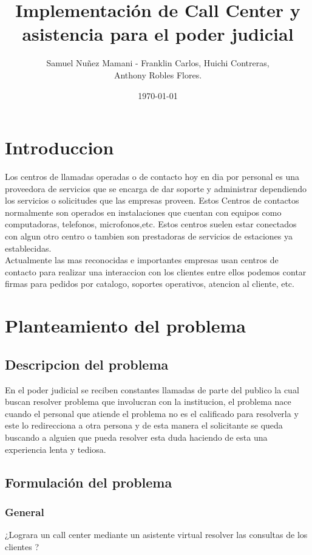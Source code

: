 \documentclass[twoside,twocolumn]{article}
\title{Implementación de Call Center y asistencia para el poder judicial}
\author{Samuel Nuñez Mamani - Franklin Carlos, Huichi Contreras, \\
Anthony Robles Flores. }
\date{\today}
\begin{document}
\maketitle


\section{Introduccion}
Los centros de llamadas operadas o de contacto  hoy en dia por personal es una proveedora de servicios que se encarga de dar soporte y administrar dependiendo los servicios o solicitudes que las empresas proveen. Estos Centros de contactos normalmente son operados en instalaciones que cuentan con equipos como computadoras, telefonos, microfonos,etc. Estos centros suelen estar conectados con algun otro centro o tambien son prestadoras de servicios de estaciones ya establecidas.\\
Actualmente las mas reconocidas e importantes empresas usan centros de contacto para realizar una interaccion con los clientes entre ellos podemos 
contar firmas para pedidos por catalogo, soportes operativos, atencion al cliente, etc.

\section{Planteamiento del problema}
\subsection{Descripcion del problema}
En el poder judicial se reciben constantes llamadas de parte del publico la cual buscan resolver problema que involucran con la institucion, el problema nace cuando el personal que atiende
el problema no es el calificado para resolverla y este lo redirecciona a otra persona y de esta manera el solicitante se queda buscando a alguien que pueda resolver esta duda haciendo de
esta una experiencia lenta y tediosa.

\subsection{Formulación del problema}
\subsubsection{General}
¿Lograra un call center mediante un asistente virtual resolver las consultas de los clientes ?
\end{document}
